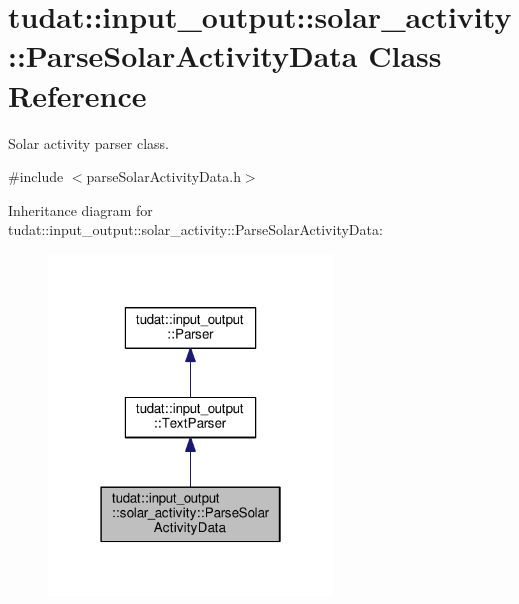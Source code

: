 \hypertarget{classtudat_1_1input__output_1_1solar__activity_1_1ParseSolarActivityData}{}\section{tudat\+:\+:input\+\_\+output\+:\+:solar\+\_\+activity\+:\+:Parse\+Solar\+Activity\+Data Class Reference}
\label{classtudat_1_1input__output_1_1solar__activity_1_1ParseSolarActivityData}


Solar activity parser class.  




{\ttfamily \#include $<$parse\+Solar\+Activity\+Data.\+h$>$}



Inheritance diagram for tudat\+:\+:input\+\_\+output\+:\+:solar\+\_\+activity\+:\+:Parse\+Solar\+Activity\+Data\+:
\nopagebreak
\begin{figure}[H]
\begin{center}
\leavevmode
\includegraphics[width=214pt]{classtudat_1_1input__output_1_1solar__activity_1_1ParseSolarActivityData__inherit__graph}
\end{center}
\end{figure}


